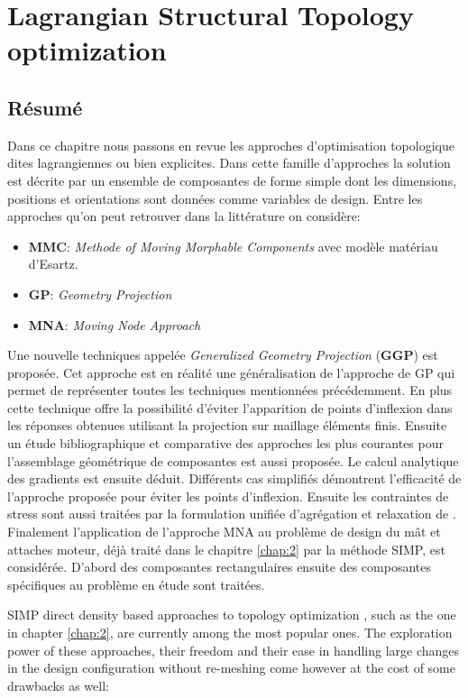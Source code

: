 \chapter{Lagrangian Structural Topology optimization}
\minitoc
\begin{mdframed}[hidealllines=true,backgroundcolor=lightgray!20]
\section*{Résumé}
Dans ce chapitre nous passons en revue les approches d'optimisation topologique dites lagrangiennes ou bien explicites. Dans cette famille d'approches la solution est décrite par un ensemble de composantes de forme simple dont les dimensions, positions et orientations sont données comme variables de design. Entre les approches qu'on peut retrouver dans la littérature on considère:
 \begin{itemize}
 \item \textbf{MMC}: \textit{Methode of Moving Morphable Components} avec modèle matériau d'Esartz.
 \item \textbf{GP}: \textit{Geometry Projection}
 \item \textbf{MNA}: \textit{Moving Node Approach}
 \end{itemize}
 Une nouvelle techniques appelée \textit{Generalized Geometry Projection} (\textbf{GGP}) \cite{coniglio2019generalized} est proposée. Cet approche est en réalité une généralisation de l'approche de GP qui permet de représenter toutes les techniques mentionnées précédemment. En plus cette technique offre la possibilité d'éviter l'apparition de points d'inflexion dans les réponses obtenues utilisant la projection sur maillage éléments finis. Ensuite un étude bibliographique et comparative des approches les plus courantes pour l'assemblage géométrique de composantes est aussi proposée. Le calcul analytique des gradients est ensuite déduit.
 Différents cas simplifiés démontrent l'efficacité de l'approche proposée pour éviter les points d'inflexion. 
 Ensuite les contraintes de stress sont aussi traitées par la formulation unifiée d'agrégation et relaxation de \cite{verbart2017unified}. Finalement l'application  de l'approche MNA au problème de design du mât et attaches moteur, déjà traité dans le chapitre \ref{chap:2} par la méthode SIMP, est considérée. D'abord des composantes rectangulaires ensuite des composantes  spécifiques au problème en étude sont traitées. 
\end{mdframed}
\label{chap:3}
    SIMP direct density based approaches to topology optimization \cite{bendsoe1989optimal,zhou1991coc,bendsoe1995optimization}, such as the one in chapter \ref{chap:2}, are currently among the most popular ones. The exploration power of these approaches, their freedom and their ease in handling large changes in the design configuration without re-meshing come however at the cost of some drawbacks as well:
